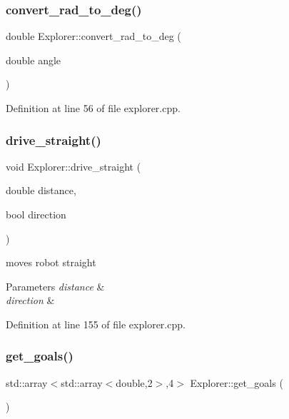 \subsubsection{\texorpdfstring{convert\+\_\+rad\+\_\+to\+\_\+deg()}{convert\_rad\_to\_deg()}}
{\footnotesize\ttfamily double Explorer\+::convert\+\_\+rad\+\_\+to\+\_\+deg (\begin{DoxyParamCaption}\item[{double}]{angle }\end{DoxyParamCaption})}



Definition at line 56 of file explorer.\+cpp.

\mbox{\label{class_explorer_ab4ca9f16c48a60fc4d0e426b6fd9e9a0}} 
\subsubsection{\texorpdfstring{drive\+\_\+straight()}{drive\_straight()}}
{\footnotesize\ttfamily void Explorer\+::drive\+\_\+straight (\begin{DoxyParamCaption}\item[{double}]{distance,  }\item[{bool}]{direction }\end{DoxyParamCaption})}



moves robot straight 


\begin{DoxyParams}{Parameters}
{\em distance} & \\
\hline
{\em direction} & \\
\hline
\end{DoxyParams}


Definition at line 155 of file explorer.\+cpp.

\mbox{\label{class_explorer_a847e3ad2e7233d493a8dcfdd7139cb58}} 
\subsubsection{\texorpdfstring{get\+\_\+goals()}{get\_goals()}}
{\footnotesize\ttfamily std\+::array$<$std\+::array$<$double,2$>$,4$>$ Explorer\+::get\+\_\+goals (\begin{DoxyParamCaption}{ }\end{DoxyParamCaption})\hspace{0.3cm}{\ttfamily [inline]}}



